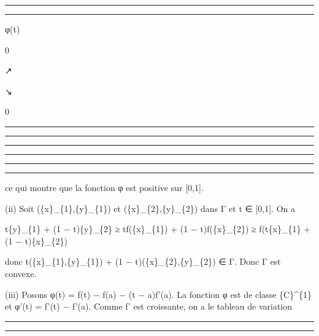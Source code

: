 \documentclass[]{article}
\begin{document}
\begin{center}\rule{3in}{0.4pt}\end{center}

\begin{center}\rule{3in}{0.4pt}\end{center}

φ(t)

0

↗

↘

0

\begin{center}\rule{3in}{0.4pt}\end{center}

\begin{center}\rule{3in}{0.4pt}\end{center}

\begin{center}\rule{3in}{0.4pt}\end{center}

\begin{center}\rule{3in}{0.4pt}\end{center}

\begin{center}\rule{3in}{0.4pt}\end{center}

\begin{center}\rule{3in}{0.4pt}\end{center}

ce qui montre que la fonction φ est positive sur {[}0,1{]}.

(ii) Soit (\{x\}\_\{1\},\{y\}\_\{1\}) et (\{x\}\_\{2\},\{y\}\_\{2\})
dans Γ et t ∈ {[}0,1{]}. On a

t\{y\}\_\{1\} + (1 − t)\{y\}\_\{2\} ≥ tf(\{x\}\_\{1\}) + (1 −
t)f(\{x\}\_\{2\}) ≥ f(t\{x\}\_\{1\} + (1 − t)\{x\}\_\{2\})

donc t(\{x\}\_\{1\},\{y\}\_\{1\}) + (1 − t)(\{x\}\_\{2\},\{y\}\_\{2\}) ∈
Γ. Donc Γ est convexe.

(iii) Posons φ(t) = f(t) − f(a) − (t − a)f'(a). La fonction φ est de
classe \{C\}\^{}\{1\} et φ'(t) = f'(t) − f'(a). Comme f' est croissante,
on a le tableau de variation

\begin{center}\rule{3in}{0.4pt}\end{center}

\begin{center}\rule{3in}{0.4pt}\end{center}
\end{document}
